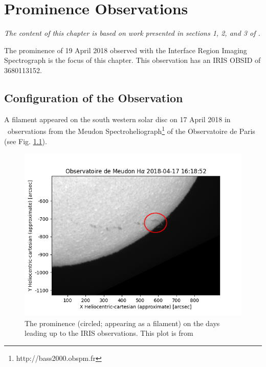 \chapter{Prominence Observations}\label{Chap:obs}

\textit{The content of this chapter is based on work presented in sections 1, 2, and 3 of \cite{peat_solar_2021}.}

The prominence of 19 April 2018 observed with the Interface Region Imaging Spectrograph \citep[IRIS; ][]{depontieu_interface_2014} is the focus of this chapter. This observation has an IRIS OBSID of 3680113152.


\section{Configuration of the Observation}
\label{20180419main}
A filament appeared on the south western solar disc on 17 April 2018 in \ha\ observations from the Meudon Spectroheliograph\footnote{http://bass2000.obspm.fr} of the Observatoire de Paris (see Fig. \ref{ha}). 
\begin{figure}
    \centering
    \includegraphics[width=0.8\linewidth]{./01Observations/figs/20180419/ha2.png}
    \caption[The prominence on the days leading up to the IRIS observations.]{The prominence (circled; appearing as a filament) on the days leading up to the IRIS observations. This plot is from \cite{peat_solar_2021}}
    \label{ha}
\end{figure}

